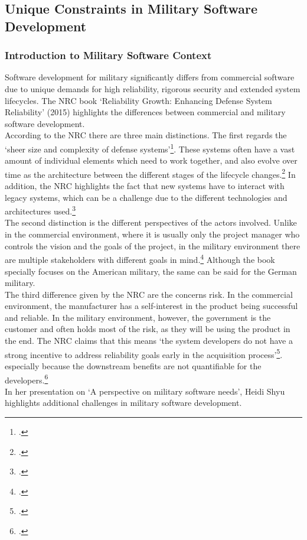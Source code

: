 \subsection{Unique Constraints in Military Software Development}
\subsubsection{Introduction to Military Software Context}
Software development for military significantly differs from commercial software due to unique demands for high reliability, rigorous security and extended system lifecycles.
The \ac{NRC} book `Reliability Growth: Enhancing Defense System Reliability' (2015) highlights the differences between commercial and military software development.\\
According to the NRC there are three main distinctions. The first regards the `sheer size and complexity of defense systems'\footcite[31]{nrc2015defense}.
These systems often have a vast amount of individual elements which need to work together, and also evolve over time as the architecture  between the different stages of 
the lifecycle changes.\footcite[32]{nrc2015defense} In addition, the \ac{NRC} highlights the fact that new systems have to interact with legacy systems, which can be a challenge
due to the different technologies and architectures used.\footcite[32]{nrc2015defense}\\
The second distinction is the different perspectives of the actors involved. Unlike in the commercial environment, where it is usually only the project manager 
who controls the vision and the goals of the project, in the military environment there are multiple stakeholders with different goals in mind.\footcite[32]{nrc2015defense}
Although the book specially focuses on the American military, the same can be said for the German military.\\
The third difference given by the NRC are the concerns risk. In the commercial environment, the manufacturer has a self-interest in the product being successful and reliable.
In the military environment, however, the government is the customer and often holds most of the risk, as they will be using the product in the end.
The NRC claims that this means `the system developers do not have a strong incentive to address reliability goals early in the acquisition process'\footcite[33]{nrc2015defense}.
especially because the downstream benefits are not quantifiable for the developers.\footcite[33]{nrc2015defense}\\
In her presentation on `A perspective on military software needs', Heidi Shyu highlights additional challenges in military software development.
